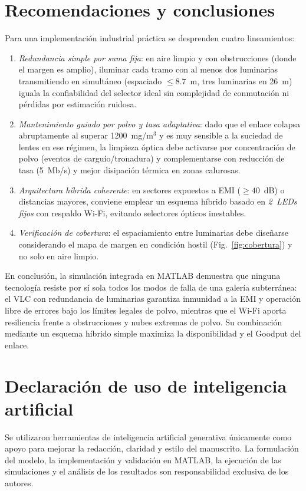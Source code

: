 \documentclass[conference]{IEEEtran}
\begin{document}
\section{Recomendaciones y conclusiones}
Para una implementación industrial práctica se desprenden cuatro lineamientos:
\begin{enumerate}
\item \emph{Redundancia simple por suma fija}: en aire limpio y con obstrucciones (donde el margen es amplio), iluminar cada tramo con al menos dos luminarias transmitiendo en simultáneo (espaciado $\le 8.7$~m, tres luminarias en 26~m) iguala la confiabilidad del selector ideal sin complejidad de conmutación ni pérdidas por estimación ruidosa.
\item \emph{Mantenimiento guiado por polvo y tasa adaptativa}: dado que el enlace colapsa abruptamente al superar 1200~mg/m$^{3}$ y es muy sensible a la suciedad de lentes en ese régimen, la limpieza óptica debe activarse por concentración de polvo (eventos de carguío/tronadura) y complementarse con reducción de tasa (5~Mb/s) y mejor disipación térmica en zonas calurosas.
\item \emph{Arquitectura híbrida coherente}: en sectores expuestos a EMI ($\ge 40$~dB) o distancias mayores, conviene emplear un esquema híbrido basado en \emph{2~LEDs fijos} con respaldo Wi-Fi, evitando selectores ópticos inestables.
\item \emph{Verificación de cobertura}: el espaciamiento entre luminarias debe diseñarse considerando el mapa de margen en condición hostil (Fig.~\ref{fig:cobertura}) y no solo en aire limpio.
\end{enumerate}

En conclusión, la simulación integrada en MATLAB demuestra que ninguna tecnología resiste por sí sola todos los modos de falla de una galería subterránea: el VLC con redundancia de luminarias garantiza inmunidad a la EMI y operación libre de errores bajo los límites legales de polvo, mientras que el Wi-Fi aporta resiliencia frente a obstrucciones y nubes extremas de polvo. Su combinación mediante un esquema híbrido simple maximiza la disponibilidad y el Goodput del enlace.

\section*{Declaración de uso de inteligencia artificial}
Se utilizaron herramientas de inteligencia artificial generativa únicamente como apoyo para mejorar la redacción, claridad y estilo del manuscrito. La formulación del modelo, la implementación y validación en MATLAB, la ejecución de las simulaciones y el análisis de los resultados son responsabilidad exclusiva de los autores.
\end{document}
